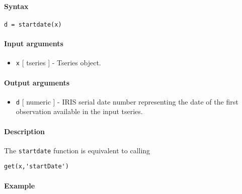 


	\paragraph{Syntax}\label{syntax}

\begin{verbatim}
d = startdate(x)
\end{verbatim}

\paragraph{Input arguments}\label{input-arguments}

\begin{itemize}
\itemsep1pt\parskip0pt
\item
  \texttt{x} {[} tseries {]} - Tseries object.
\end{itemize}

\paragraph{Output arguments}\label{output-arguments}

\begin{itemize}
\itemsep1pt\parskip0pt
\item
  \texttt{d} {[} numeric {]} - IRIS serial date number representing the
  date of the first observation available in the input tseries.
\end{itemize}

\paragraph{Description}\label{description}

The \texttt{startdate} function is equivalent to calling

\begin{verbatim}
get(x,'startDate')
\end{verbatim}

\paragraph{Example}\label{example}


